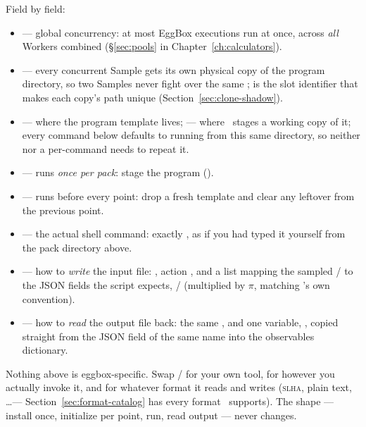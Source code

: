 Field by field:

\begin{itemize}
  \item {} --- global concurrency: at most  EggBox
        executions run at once, across \emph{all} Workers combined (\S\ref{sec:pools}
        in Chapter~\ref{ch:calculators}).
  \item {} --- every concurrent Sample gets its own physical
        copy of the program directory, so two Samples never fight over the same
        ;  is the slot identifier that makes each copy's
        path unique (Section~\ref{sec:clone-shadow}).
  \item {} --- where the program template lives;  --- where
        \Jtwo\ stages a working copy of it; every command below defaults to running from
        this same directory, so neither  nor a per-command
         needs to repeat it.
  \item {} --- runs \emph{once per pack}: stage the program
        ().
  \item {} --- runs before every point: drop a fresh
         template and clear any leftover
         from the previous point.
  \item {} --- the actual shell command: exactly
        , as if you had typed it yourself from the pack directory
        above.
  \item {} --- how to \emph{write} the input file: , action , and a  list mapping the sampled
        / to the JSON fields the script expects, /
        (multiplied by $\pi$, matching 's own convention).
  \item {} --- how to \emph{read} the output file back: the
        same , and one variable, , copied straight from the
        JSON field of the same name into the observables dictionary.
\end{itemize}

\begin{jnote}
Nothing above is eggbox-specific. Swap / for your own
tool,  for however you actually invoke it, and
 for whatever format it reads and writes (\textsc{slha}, plain
text, \ldots --- Section~\ref{sec:format-catalog} has every format \Portal\
supports). The
shape --- install once, initialize per point, run, read output --- never changes.
\end{jnote}


